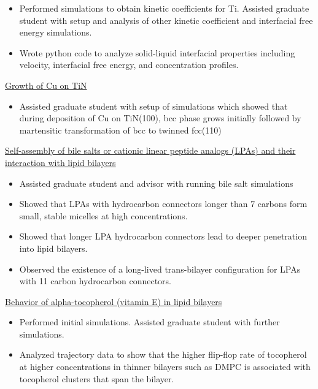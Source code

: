 \begin{cventries}
{\begin{cvitems}
            \begin{itemize}
            \item {Performed simulations to obtain kinetic coefficients for Ti. Assisted graduate student with setup and analysis of other kinetic coefficient and interfacial free energy simulations.}
            \item {Wrote python code to analyze solid-liquid interfacial properties including velocity, interfacial free energy, and concentration profiles.}
            \end{itemize}
        \item {\underline{Growth of Cu on TiN}}
            \begin{itemize}
            \item {Assisted graduate student with setup of simulations which showed that during deposition of Cu on TiN(100), bcc phase grows initially followed by martensitic transformation of bcc to twinned fcc(110)}
            \end{itemize}
        \item {\underline{Self-assembly of bile salts or cationic linear peptide analogs (LPAs) and their interaction with lipid bilayers}}
            \begin{itemize}
            \item {Assisted graduate student and advisor with running bile salt simulations}
            \item {Showed that LPAs with hydrocarbon connectors longer than 7 carbons form small, stable micelles at high concentrations.}
            \item {Showed that longer LPA hydrocarbon connectors lead to deeper penetration into lipid bilayers.}
            \item {Observed the existence of a long-lived trans-bilayer configuration for LPAs with 11 carbon hydrocarbon connectors.}
            \end{itemize}
        \item {\underline{Behavior of alpha-tocopherol (vitamin E) in lipid bilayers}}
            \begin{itemize}
            \item {Performed initial simulations. Assisted graduate student with further simulations.}
            \item {Analyzed trajectory data to show that the higher flip-flop rate of tocopherol at higher concentrations in thinner bilayers such as DMPC is associated with tocopherol clusters that span the bilayer.}

\end{itemize}
\end{cvitems}}
\end{cventries}
